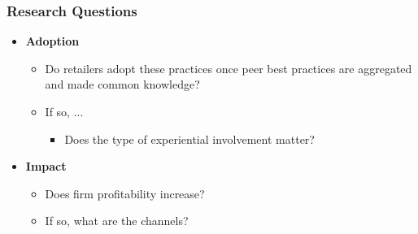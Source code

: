 \documentclass[10pt]{beamer}
\begin{document}
\begin{frame}
\frametitle{Research Questions}
	\begin{itemize}
	\item \textbf{Adoption}
		\begin{itemize}
		\item Do retailers adopt these practices once peer best practices are aggregated and made common knowledge?
		\item If so, ...
			\begin{itemize}
			\item Does the type of experiential involvement matter?
			\end{itemize}
		\end{itemize}
    \vspace{0.3in}
	\item \textbf{Impact}
		\begin{itemize}
		\item Does firm profitability increase?
		\item If so, what are the channels?
		\end{itemize}
	\end{itemize}
\end{frame}
\end{document}
